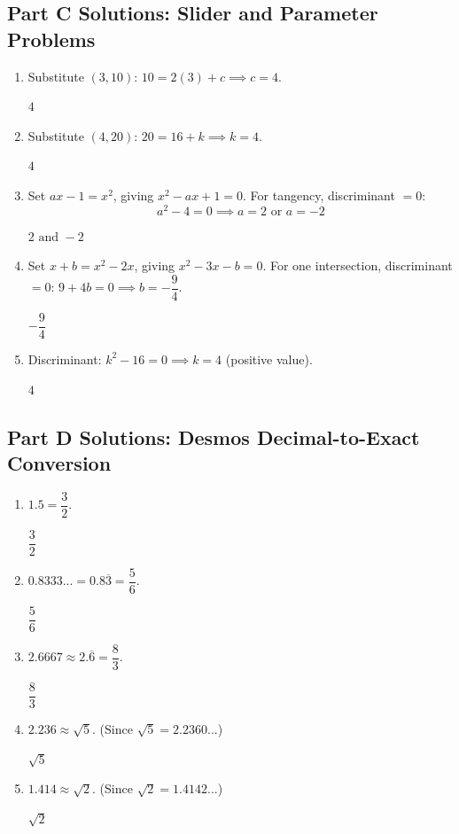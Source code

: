 \documentclass[14pt]{extarticle}
\begin{document}
\subsection*{Part C Solutions: Slider and Parameter Problems}
\begin{enumerate}
  \item Substitute \((3, 10)\): \(10 = 2(3) + c \implies c = 4\).

  \(\boxed{4}\)

  \item Substitute \((4, 20)\): \(20 = 16 + k \implies k = 4\).

  \(\boxed{4}\)

  \item Set \(ax - 1 = x^2\), giving \(x^2 - ax + 1 = 0\). For tangency, discriminant \(= 0\):
  \[
  a^2 - 4 = 0 \implies a = 2 \text{ or } a = -2
  \]

  \(\boxed{2 \text{ and } -2}\)

  \item Set \(x + b = x^2 - 2x\), giving \(x^2 - 3x - b = 0\). For one intersection, discriminant \(= 0\): \(9 + 4b = 0 \implies b = -\dfrac{9}{4}\).

  \(\boxed{-\dfrac{9}{4}}\)

  \item Discriminant: \(k^2 - 16 = 0 \implies k = 4\) (positive value).

  \(\boxed{4}\)
\end{enumerate}

\subsection*{Part D Solutions: Desmos Decimal-to-Exact Conversion}
\begin{enumerate}
  \item \(1.5 = \dfrac{3}{2}\).

  \(\boxed{\dfrac{3}{2}}\)

  \item \(0.8333... = 0.8\overline{3} = \dfrac{5}{6}\).

  \(\boxed{\dfrac{5}{6}}\)

  \item \(2.6667 \approx 2.\overline{6} = \dfrac{8}{3}\).

  \(\boxed{\dfrac{8}{3}}\)

  \item \(2.236 \approx \sqrt{5}\). (Since \(\sqrt{5} = 2.2360...\))

  \(\boxed{\sqrt{5}}\)

  \item \(1.414 \approx \sqrt{2}\). (Since \(\sqrt{2} = 1.4142...\))

  \(\boxed{\sqrt{2}}\)
\end{enumerate}
\end{document}
